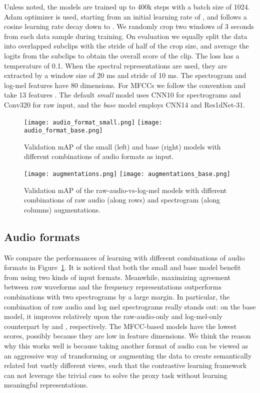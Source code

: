 \documentclass{article}
\begin{document}
Unless noted, the models are trained up to 400k steps with a batch size of 1024. Adam optimizer is used, starting from an initial learning rate of , and follows a cosine learning rate decay down to . We randomly crop two windows of 3 seconds from each data sample during training. On evaluation we equally split the data into overlapped subclips with the stride of half of the crop size, and average the logits from the subclips to obtain the overall score of the clip. The loss has a temperature of 0.1. When the spectral representations are used, they are extracted by a window size of 20 ms and stride of 10 ms. The spectrogram and log-mel features have 80 dimensions. For MFCCs we follow the convention and take 13 features \cite{jurafsky2008speech}. The default \emph{small} model uses CNN10 for spectrograms and Conv320 for raw input, and the \emph{base} model employs CNN14 and Res1dNet-31.

\begin{figure}[t]
  \centering
  \texttt{[image: audio\_format\_small.png]}
  \texttt{[image: audio\_format\_base.png]}
  \caption{Validation mAP of the small (left) and base (right) models with different combinations of audio formats as input.}
  \label{fig:audio_formats}
\end{figure}

\begin{figure}[t]
  \centering
  \texttt{[image: augmentations.png]}
  \texttt{[image: augmentations\_base.png]}
  \caption{Validation mAP of the raw-audio-vs-log-mel models with different combinations of raw audio (along rows) and spectrogram (along columns) augmentations.}
  \label{fig:augmentations}
\end{figure}

\subsection{Audio formats}

We compare the performances of learning with different combinations of audio formats in Figure~\ref{fig:audio_formats}. It is noticed that both the small and base model benefit from using two kinds of input formats. Meanwhile, maximizing agreement between raw waveforms and the frequency representations outperforms combinations with two spectrograms by a large margin. In particular, the combination of raw audio and log mel spectrograms really stands out: on the base model, it improves relatively upon the raw-audio-only and log-mel-only counterpart by  and , respectively. The MFCC-based models have the lowest scores, possibly because they are low in feature dimensions. We think the reason why this works well is because taking another format of audio can be viewed as an aggressive way of transforming or augmenting the data to create semantically related but vastly different views, such that the contrastive learning framework can not leverage the trivial cues to solve the proxy task without learning meaningful representations.
\end{document}
